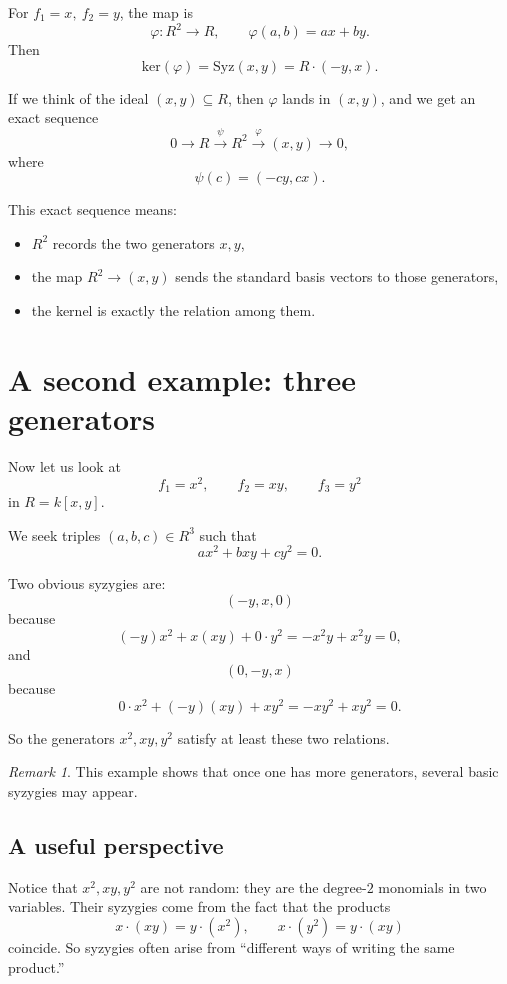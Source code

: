 \documentclass[11pt]{article}
\theoremstyle{definition}
\theoremstyle{remark}
\newtheorem{remark}[theorem]{Remark}
\newcommand{\Syz}{\mathrm{Syz}}
\newcommand{\kerR}{\mathrm{ker}}
\begin{document}
	For \(f_1=x,\ f_2=y\), the map is
	\[
	\varphi:R^2\to R,\qquad \varphi(a,b)=ax+by.
	\]
	Then
	\[
	\kerR(\varphi)=\Syz(x,y)=R\cdot(-y,x).
	\]
	
	If we think of the ideal \((x,y)\subseteq R\), then \(\varphi\) lands in \((x,y)\), and we get an exact sequence
	\[
	0\to R\xrightarrow{\psi} R^2\xrightarrow{\varphi} (x,y)\to 0,
	\]
	where
	\[
	\psi(c)=(-cy,cx).
	\]
	
	This exact sequence means:
	
	\begin{itemize}[leftmargin=2em]
		\item \(R^2\) records the two generators \(x,y\),
		\item the map \(R^2\to (x,y)\) sends the standard basis vectors to those generators,
		\item the kernel is exactly the relation among them.
	\end{itemize}
	
	\section{A second example: three generators}
	
	Now let us look at
	\[
	f_1=x^2,\qquad f_2=xy,\qquad f_3=y^2
	\]
	in \(R=k[x,y]\).
	
	We seek triples \((a,b,c)\in R^3\) such that
	\[
	a x^2 + bxy + c y^2 = 0.
	\]
	
	Two obvious syzygies are:
	\[
	(-y,x,0)
	\]
	because
	\[
	(-y)x^2 + x(xy) + 0\cdot y^2 = -x^2y+x^2y=0,
	\]
	and
	\[
	(0,-y,x)
	\]
	because
	\[
	0\cdot x^2 + (-y)(xy) + x y^2 = -xy^2+xy^2=0.
	\]
	
	So the generators \(x^2,xy,y^2\) satisfy at least these two relations.
	
	\begin{remark}
		This example shows that once one has more generators, several basic syzygies may appear.
	\end{remark}
	
	\subsection{A useful perspective}
	
	Notice that \(x^2,xy,y^2\) are not random: they are the degree-\(2\) monomials in two variables. Their syzygies come from the fact that the products
	\[
	x\cdot (xy)=y\cdot (x^2),\qquad
	x\cdot (y^2)=y\cdot (xy)
	\]
	coincide. So syzygies often arise from ``different ways of writing the same product.''
	
\end{document}
